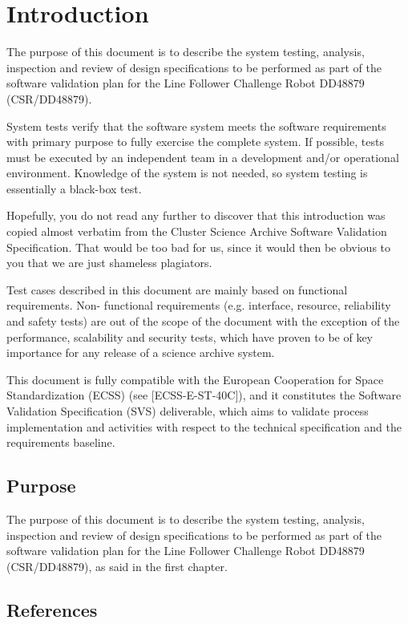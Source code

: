 \chapter{Introduction}
\label{ch:intro}

The purpose of this document is to describe the system testing, analysis, inspection and
review of design specifications to be performed as part of the software validation plan for
the Line Follower Challenge Robot DD48879 (CSR/DD48879).

System tests verify that the software system meets the software requirements with primary
purpose to fully exercise the complete system. If possible, tests must be executed by an
independent team in a development and/or operational environment. Knowledge of the
system is not needed, so system testing is essentially a black-box test.

Hopefully, you do not read any further to discover that this introduction was copied almost
verbatim from the Cluster Science Archive Software Validation Specification. That would be
too bad for us, since it would then be obvious to you that we are just shameless plagiators.

Test cases described in this document are mainly based on functional requirements. Non-
functional requirements (e.g. interface, resource, reliability and safety tests) are out of the
scope of the document with the exception of the performance, scalability and security tests,
which have proven to be of key importance for any release of a science archive system.

This document is fully compatible with the European Cooperation for Space
Standardization (ECSS) (see [ECSS-E-ST-40C]), and it constitutes the Software Validation
Specification (SVS) deliverable, which aims to validate process implementation and
activities with respect to the technical specification and the requirements baseline.


\section{Purpose}

The purpose of this document is to describe the system testing, analysis, inspection and
review of design specifications to be performed as part of the software validation plan for
the Line Follower Challenge Robot DD48879 (CSR/DD48879), as said in the first chapter.

\section{References}

